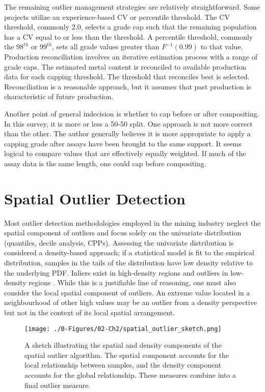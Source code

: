 The remaining outlier management strategies are relatively straightforward. Some projects utilize an experience-based \gls{CV} or percentile threshold. The \gls{CV} threshold, commonly 2.0, selects a grade cap such that the remaining population has a \gls{CV} equal to or less than the threshold. A percentile threshold, commonly the $98^{th}$ or $99^{th}$, sets all grade values greater than $F^{-1}(0.99)$ to that value. Production reconciliation involves an iterative estimation process with a range of grade caps. The estimated metal content is reconciled to available production data for each capping threshold. The threshold that reconciles best is selected. Reconciliation is a reasonable approach, but it assumes that past production is characteristic of future production.

Another point of general indecision is whether to cap before or after compositing. In this survey, it is more or less a 50-50 split. One approach is not more correct than the other. The author generally believes it is more appropriate to apply a capping grade after assays have been brought to the same support. It seems logical to compare values that are effectively equally weighted. If much of the assay data is the same length, one could cap before compositing.

\FloatBarrier
\section{Spatial Outlier Detection}
\label{sec:02spatial}

Most outlier detection methodologies employed in the mining industry neglect the spatial component of outliers and focus solely on the univariate distribution (quantiles, decile analysis, \glspl{CPP}). Assessing the univariate distribution is considered a density-based approach; if a statistical model is fit to the empirical distribution, samples in the tails of the distribution have low density relative to the underlying \gls{PDF}. Inliers exist in high-density regions and outliers in low-density regions \citep{geron2019hands}. While this is a justifiable line of reasoning, one must also consider the local spatial component of outliers. An extreme value located in a neighbourhood of other high values may be an outlier from a density perspective but not in the context of its local spatial arrangement.

\begin{figure}[htb!]
    \centering
    \texttt{[image: ./0-Figures/02-Ch2/spatial\_outlier\_sketch.png]}
    \caption{A sketch illustrating the spatial and density components of the spatial outlier algorithm. The spatial component accounts for the local relationship between samples, and the density component accounts for the global relationship. These measures combine into a final outlier measure.}
    \label{fig:spatial_outlier_sketch}
\end{figure}


